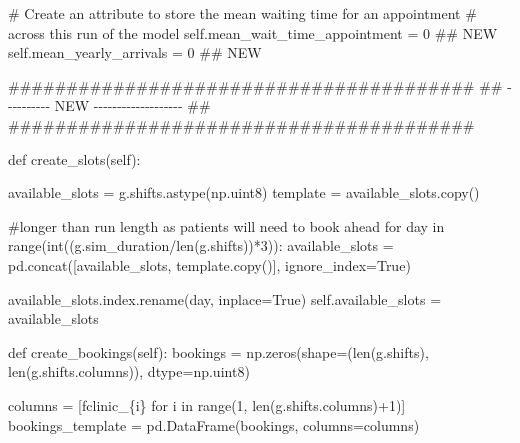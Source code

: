 \documentclass[
  letterpaper,
  DIV=11,
  numbers=noendperiod]{scrreprt}
\newenvironment{Shaded}{\begin{snugshade}}{\end{snugshade}}
\newcommand{\BuiltInTok}[1]{\textcolor[rgb]{0.00,0.23,0.31}{#1}}
\newcommand{\CommentTok}[1]{\textcolor[rgb]{0.37,0.37,0.37}{#1}}
\newcommand{\ControlFlowTok}[1]{\textcolor[rgb]{0.00,0.23,0.31}{#1}}
\newcommand{\DecValTok}[1]{\textcolor[rgb]{0.68,0.00,0.00}{#1}}
\newcommand{\KeywordTok}[1]{\textcolor[rgb]{0.00,0.23,0.31}{#1}}
\newcommand{\NormalTok}[1]{\textcolor[rgb]{0.00,0.23,0.31}{#1}}
\newcommand{\OperatorTok}[1]{\textcolor[rgb]{0.37,0.37,0.37}{#1}}
\newcommand{\SpecialCharTok}[1]{\textcolor[rgb]{0.37,0.37,0.37}{#1}}
\newcommand{\SpecialStringTok}[1]{\textcolor[rgb]{0.13,0.47,0.30}{#1}}
\newcommand{\StringTok}[1]{\textcolor[rgb]{0.13,0.47,0.30}{#1}}
\newcommand{\VariableTok}[1]{\textcolor[rgb]{0.07,0.07,0.07}{#1}}
\begin{document}
\begin{Shaded}
\begin{Highlighting}[]
        \CommentTok{\# Create an attribute to store the mean waiting time for an appointment}
        \CommentTok{\# across this run of the model}
        \VariableTok{self}\NormalTok{.mean\_wait\_time\_appointment }\OperatorTok{=} \DecValTok{0} \CommentTok{\#\# NEW}
        \VariableTok{self}\NormalTok{.mean\_yearly\_arrivals }\OperatorTok{=} \DecValTok{0} \CommentTok{\#\# NEW}

    \CommentTok{\#\#\#\#\#\#\#\#\#\#\#\#\#\#\#\#\#\#\#\#\#\#\#\#\#\#\#\#\#\#\#\#\#\#\#\#\#\#\#\#}
    \CommentTok{\#\# {-}{-}{-}{-}{-}{-}{-}{-}{-}{-} NEW {-}{-}{-}{-}{-}{-}{-}{-}{-}{-}{-}{-}{-}{-}{-}{-}{-}{-}{-} \#\#}
    \CommentTok{\#\#\#\#\#\#\#\#\#\#\#\#\#\#\#\#\#\#\#\#\#\#\#\#\#\#\#\#\#\#\#\#\#\#\#\#\#\#\#\#}

    \KeywordTok{def}\NormalTok{ create\_slots(}\VariableTok{self}\NormalTok{):}

\NormalTok{        available\_slots }\OperatorTok{=}\NormalTok{ g.shifts.astype(np.uint8)}
\NormalTok{        template }\OperatorTok{=}\NormalTok{ available\_slots.copy()}

        \CommentTok{\#longer than run length as patients will need to book ahead}
        \ControlFlowTok{for}\NormalTok{ day }\KeywordTok{in} \BuiltInTok{range}\NormalTok{(}\BuiltInTok{int}\NormalTok{((g.sim\_duration}\OperatorTok{/}\BuiltInTok{len}\NormalTok{(g.shifts))}\OperatorTok{*}\DecValTok{3}\NormalTok{)):}
\NormalTok{            available\_slots }\OperatorTok{=}\NormalTok{ pd.concat([available\_slots, template.copy()],}
\NormalTok{                                         ignore\_index}\OperatorTok{=}\VariableTok{True}\NormalTok{)}

\NormalTok{        available\_slots.index.rename(}\StringTok{\textquotesingle{}day\textquotesingle{}}\NormalTok{, inplace}\OperatorTok{=}\VariableTok{True}\NormalTok{)}
        \VariableTok{self}\NormalTok{.available\_slots }\OperatorTok{=}\NormalTok{ available\_slots}

    \KeywordTok{def}\NormalTok{ create\_bookings(}\VariableTok{self}\NormalTok{):}
\NormalTok{        bookings }\OperatorTok{=}\NormalTok{ np.zeros(shape}\OperatorTok{=}\NormalTok{(}\BuiltInTok{len}\NormalTok{(g.shifts), }\BuiltInTok{len}\NormalTok{(g.shifts.columns)), dtype}\OperatorTok{=}\NormalTok{np.uint8)}

\NormalTok{        columns }\OperatorTok{=}\NormalTok{ [}\SpecialStringTok{f\textquotesingle{}clinic\_}\SpecialCharTok{\{}\NormalTok{i}\SpecialCharTok{\}}\SpecialStringTok{\textquotesingle{}} \ControlFlowTok{for}\NormalTok{ i }\KeywordTok{in} \BuiltInTok{range}\NormalTok{(}\DecValTok{1}\NormalTok{, }\BuiltInTok{len}\NormalTok{(g.shifts.columns)}\OperatorTok{+}\DecValTok{1}\NormalTok{)]}
\NormalTok{        bookings\_template }\OperatorTok{=}\NormalTok{ pd.DataFrame(bookings, columns}\OperatorTok{=}\NormalTok{columns)}


\end{Highlighting}
\end{Shaded}
\end{document}
